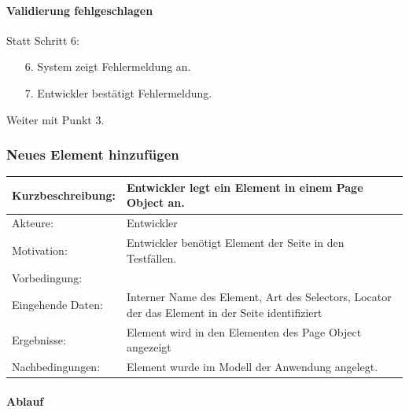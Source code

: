 \paragraph{Validierung fehlgeschlagen}
Statt Schritt 6:
\begin{itemize}[itemsep=0pt]
\item[6.] System zeigt Fehlermeldung an. 
\item[7.] Entwickler bestätigt Fehlermeldung. 
\end{itemize}
Weiter mit Punkt 3. 


\subsubsection{Neues Element hinzufügen}
\label{sec:neues_element_hinzufügen}

\begin{tabular}[h]{|p{4cm}|p{}|}
\hline 
\rule[-1ex]{0pt}{2.5ex}Kurzbeschreibung: & 
Entwickler legt ein Element in einem Page Object an. \\  
\hline 
\rule[-1ex]{0pt}{2.5ex}Akteure: & 
Entwickler \\ 
\hline 
\rule[-1ex]{0pt}{2.5ex}Motivation: & 
Entwickler benötigt Element der Seite in den Testfällen. \\ 
\hline 
\rule[-1ex]{0pt}{2.5ex}Vorbedingung: &  \\ 
\hline 
\rule[-1ex]{0pt}{2.5ex}Eingehende Daten: & Interner Name des Element, Art des Selectors, Locator der das Element in der Seite identifiziert \\ 
\hline 
\rule[-1ex]{0pt}{2.5ex}Ergebnisse: & Element wird in den Elementen des Page Object angezeigt \\ 
\hline 
\rule[-1ex]{0pt}{2.5ex}Nachbedingungen: & Element wurde im Modell der Anwendung angelegt.  \\ 
\hline 
\end{tabular} 

\paragraph{Ablauf}

